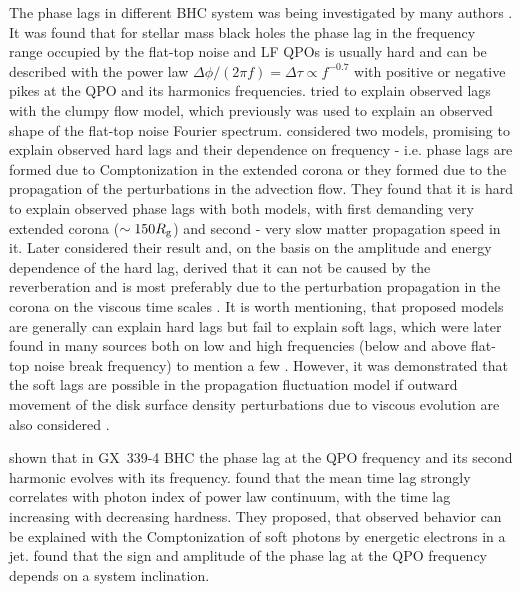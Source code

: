 \documentclass[a4paper,fleqn,usenatbib]{mnras}
\begin{document}
        The phase lags in different BHC system was being investigated by many authors \citep[see, e.g.][]{2003A&A...407..335M, 2006A&A...449..703R, 2011A&A...533A...8B, 2011MNRAS.415..292M, 2013MNRAS.435.2132M, 2017MNRAS.471.1475D}.
It was found that for stellar mass black holes the phase lag in the frequency range occupied by the flat-top noise and LF QPOs is usually hard and can be described with the power law $\Delta \phi /(2\pi f) = \Delta \tau \propto f^{-0.7}$ \citep{1989Natur.342..773M, 1999ApJ...517..355N} with positive or negative pikes at the QPO and its harmonics frequencies. 
\citet{1989Natur.342..773M} tried to explain observed lags with the clumpy flow model, which previously was used to explain an observed shape of the flat-top noise Fourier spectrum.
\citet{1999ApJ...515..726N} considered two models, promising to explain observed hard lags and their dependence on frequency - i.e. phase lags are formed due to Comptonization in the extended corona or they formed due to the propagation of the perturbations in the advection flow.  
They found that it is hard to explain observed phase lags with both models, with first demanding very extended corona ($\sim150 R_{\rm g}$) and second - very slow matter propagation speed in it.
Later \citet{2001MNRAS.327..799K} considered their result and, on the basis on the amplitude and energy dependence of the hard lag, derived that it can not be caused by the reverberation and is most preferably due to the perturbation propagation in the corona on the viscous time scales \citep[see also][on simulations results]{2006MNRAS.367..801A}.
It is worth mentioning, that proposed models are generally can explain hard lags but fail to explain soft lags, which were later found in many sources both on low and high frequencies (below and above flat-top noise break frequency) to mention a few \citep[][]{2010MNRAS.407.2166G, 2012MNRAS.427.2985C, 2017MNRAS.465.1926Y, 2017MNRAS.464.2643V}.
However, it was demonstrated that the soft lags are possible in the propagation fluctuation model if outward movement of the disk surface density perturbations due to viscous evolution are also considered \citep{2017arXiv170707578M}.  

\citet{2017ApJ...845..143Z} shown that in GX~339-4 BHC the phase lag at the QPO frequency and its second harmonic evolves with its frequency. 
\citet{2018MNRAS.473.4644R} found that the mean time lag strongly correlates with photon index of power law continuum, with the time lag increasing with decreasing hardness. 
They proposed, that observed behavior can be explained with the Comptonization of soft photons by energetic electrons in a jet.
\citet{2017MNRAS.464.2643V} found that the sign and amplitude of the phase lag at the QPO frequency depends on a system inclination.
\end{document}
